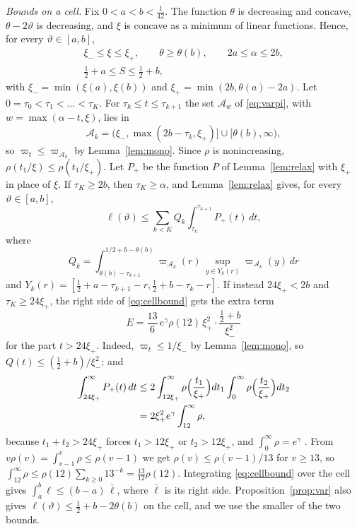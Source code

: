 \documentclass[aps,prd,twocolumn,superscriptaddress,nofootinbib,longbibliography,floatfix,showkeys,nobalancelastpage,amsmath,amssymb,10pt]{revtex4-2}
\theoremstyle{plain}
\theoremstyle{definition}
\theoremstyle{plain}
\begin{document}
\emph{Bounds on a cell.} Fix $0<a<b<\frac1{42}$. The function $\theta$ is decreasing and concave, $\theta-2\vartheta$ is decreasing, and $\xi$ is concave as a minimum of linear functions. Hence, for every $\vartheta\in[a,b]$,
\begin{gather*}
\xi_-\le\xi\le\xi_+,\qquad\theta\ge\theta(b),\qquad2a\le\alpha\le2b,\\
\tfrac12+a\le S\le\tfrac12+b,
\end{gather*}
with $\xi_-=\min(\xi(a),\xi(b))$ and $\xi_+=\min(2b,\theta(a)-2a)$. Let $0=\tau_0<\tau_1<\dots<\tau_K$. For $\tau_k\le t\le\tau_{k+1}$ the set $\mathcal A_w$ of \eqref{eq:varpi}, with $w=\max(\alpha-t,\xi)$, lies in
\[
\mathcal A_k=\bigl(\xi_-,\max(2b-\tau_k,\xi_+)\bigr]\cup[\theta(b),\infty),
\]
so $\varpi_t\le\varpi_{\mathcal A_k}$ by Lemma~\ref{lem:mono}. Since $\rho$ is nonincreasing, $\rho(t_1/\xi)\le\rho(t_1/\xi_+)$. Let $P_+$ be the function $P$ of Lemma~\ref{lem:relax} with $\xi_+$ in place of $\xi$. If $\tau_K\ge2b$, then $\tau_K\ge\alpha$, and Lemma~\ref{lem:relax} gives, for every $\vartheta\in[a,b]$,
\begin{equation}\label{eq:cellbound}
\ell(\vartheta)\le\sum_{k<K}Q_k\int_{\tau_k}^{\tau_{k+1}}P_+(t)\,dt,
\end{equation}
where
\[
Q_k=\int_{\theta(b)-\tau_{k+1}}^{1/2+b-\theta(b)}\varpi_{\mathcal A_k}(r)\,\sup_{y\in Y_k(r)}\varpi_{\mathcal A_k}(y)\,dr
\]
and $Y_k(r)=[\frac12+a-\tau_{k+1}-r,\frac12+b-\tau_k-r]$. If instead $24\xi_+<2b$ and $\tau_K\ge24\xi_+$, the right side of \eqref{eq:cellbound} gets the extra term
\begin{equation}\label{eq:celltail}
E=\frac{13}6\,e^\gamma\rho(12)\,\xi_+^2\cdot\frac{\frac12+b}{\xi_-^2}
\end{equation}
for the part $t>24\xi_+$. Indeed, $\varpi_t\le1/\xi_-$ by Lemma~\ref{lem:mono}, so $Q(t)\le(\frac12+b)/\xi_-^2$; and
\begin{align*}
\int_{24\xi_+}^\infty P_+(t)\,dt&\le2\int_{12\xi_+}^\infty\rho\Bigl(\frac{t_1}{\xi_+}\Bigr)dt_1\int_0^\infty\rho\Bigl(\frac{t_2}{\xi_+}\Bigr)dt_2\\
&=2\xi_+^2e^\gamma\int_{12}^\infty\rho,
\end{align*}
because $t_1+t_2>24\xi_+$ forces $t_1>12\xi_+$ or $t_2>12\xi_+$, and $\int_0^\infty\rho=e^\gamma$ \cite[Chapter~III.5]{Ten}. From $v\rho(v)=\int_{v-1}^v\rho\le\rho(v-1)$ we get $\rho(v)\le\rho(v-1)/13$ for $v\ge13$, so $\int_{12}^\infty\rho\le\rho(12)\sum_{k\ge0}13^{-k}=\frac{13}{12}\rho(12)$. Integrating \eqref{eq:cellbound} over the cell gives $\int_a^b\ell\le(b-a)\,\bar\ell$, where $\bar\ell$ is its right side. Proposition~\ref{prop:var} also gives $\ell(\vartheta)\le\frac12+b-2\theta(b)$ on the cell, and we use the smaller of the two bounds.
\end{document}
